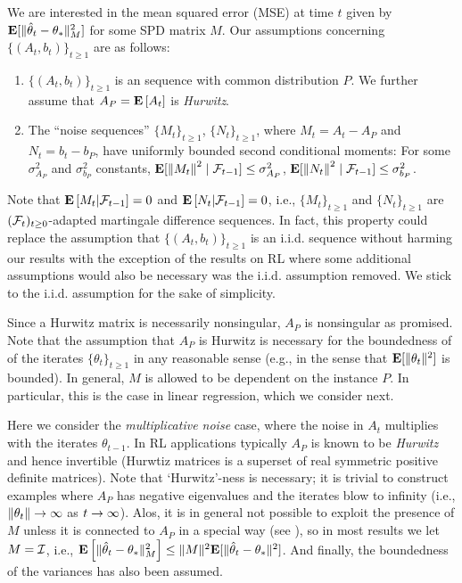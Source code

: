 We are interested in the mean squared error (MSE) at time $t$ given by $\mathbf{E}[\| \hat{\theta}_t-\theta_*\|^2_M]$ 
for some SPD matrix $M$. Our assumptions concerning $\{(A_t,b_t)\}_{t\ge 1}$ are as follows:
\begin{assumption}\label{assmp:lsa}
\begin{enumerate}[leftmargin=*, before = \leavevmode\vspace{-\baselineskip}]
\item \label{dist} $\{(A_t, b_t)\}_{t\ge 1}$ is an \iid sequence with common distribution $P$. 
We further assume that $A_P = \mathbf{E}\left[A_t\right]$ is \emph{Hurwitz}.  
\item \label{matvar}  
The ``noise sequences'' $\{M_t\}_{t\ge 1}$, $\{N_t\}_{t\ge 1}$,
where  $M_t= A_t-A_{P}$ 
 and $N_t= b_t-b_{P}$,
have uniformly bounded second conditional moments:
For some $\sigma^2_{A_P}$ and $\sigma^2_{b_P}$ constants,
$\mathbf{E}[\left\| M_t\right\|^2\mid\mathcal{F}_{t-1}]\leq \sigma^2_{A_P}$,
$\mathbf{E}[\left\| N_t\right\|^2\mid\mathcal{F}_{t-1}] \leq\sigma^2_{b_P}$.
\end{enumerate}
\end{assumption}
Note that $\mathbf{E}\left[M_t|\mathcal{F}_{t-1}\right]=0$ and $\mathbf{E}\left[N_t|\mathcal{F}_{t-1}\right]=0$, i.e., $\{M_t\}_{t\ge 1}$
and $\{N_t\}_{t\ge 1}$ are $(\mathcal{F}_t)_{t\ge 0}$-adapted martingale difference sequences. 
In fact, this property could replace
the assumption that $\{(A_t,b_t)\}_{t\ge 1}$ is an i.i.d. sequence without harming our results with the exception of the results on RL where some additional assumptions would also be necessary was the i.i.d. assumption removed. We stick to the i.i.d. assumption for the sake of simplicity.

Since a Hurwitz matrix is necessarily nonsingular, $A_P$ is nonsingular as promised.
Note that the assumption that $A_P$ is Hurwitz is necessary for the boundedness of
of the iterates $\{\theta_t\}_{t\ge 1}$ in any reasonable sense (e.g., in the sense that 
 $\mathbf{E}[\| \theta_t\|^2]$ is bounded).
 In general, $M$ is allowed to be dependent on the instance $P$. In particular, 
 this is the case in linear regression, which we consider next.

Here we consider the \emph{multiplicative noise} case, where the noise in $A_t$ multiplies with the iterates $\theta_{t-1}$. In RL applications typically $A_P$ is known to be \emph{Hurwitz} and hence invertible (Hurwtiz matrices is a superset of real symmetric positive definite matrices). Note that `Hurwitz'-ness is necessary; it is trivial to construct examples where $A_P$ has negative eigenvalues and the iterates blow to infinity (i.e., $\left\| \theta_t\right\|\rightarrow\infty$ as $t\rightarrow\infty$). Alos, it is in general not possible to exploit the presence of $M$ unless it is connected to $A_P$ in a special way (see ), so in most results we let $M = \mathcal{I}$, i.e., $\mathbf{E}\left[\| \hat{\theta}_t-\theta_*\|^2_M\right]\leq \| M\|^2\mathbf{E}[\| \hat{\theta}_t-\theta_*\|^2]$. 
And finally, the boundedness of the variances has also been assumed. 
\fi


